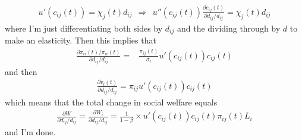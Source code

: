 \documentclass[12pt,pdftex]{article}
\begin{document}
\begin{onehalfspacing}
\begin{align}
u'(c_{ij}(t) ) = \chi_{j}(t) d_{ij} \ \ \Rightarrow \ \ u''(c_{ij}(t))\frac{\partial c_{ij}(t)}{\partial d_{ij} / d_{ij}} = \chi_{j}(t)d_{ij}
\end{align}
where I'm just differentiating both sides by $d_{ij}$ and the dividing through by $d$ to make an elasticity. Then this implies that
\begin{align}
\frac{\partial \pi_{ii}(t) / \pi_{ii}(t)}{\partial d_{ij} / d_{ij}} =& \frac{\pi_{ij}(t)}{\sigma_{\epsilon}}u'(c_{ij}(t))c_{ij}(t)
\end{align}
and then
\begin{align}
\frac{\partial v_i(t)}{\partial d_{ij} / d_{ij}} = \pi_{ij}u'(c_{ij}(t))c_{ij}(t)
\end{align}
which means that the total change in social welfare equals
\begin{align}
\frac{\partial W}{\partial d_{ij} / d_{ij}} = \frac{\partial W_i}{\partial d_{ij} / d_{ij}} = \frac{1}{1-\beta} \times u'(c_{ij}(t)) c_{ij}(t) \pi_{ij}(t) L_i
\end{align}
and I'm done.


\newpage



\end{onehalfspacing}
\end{document}
